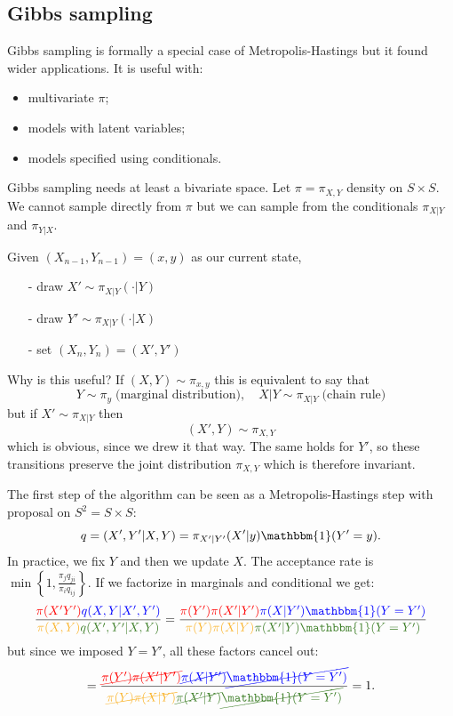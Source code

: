 \documentclass{article}
\begin{document}
\subsection{Gibbs sampling}
Gibbs sampling is formally a special case of Metropolis-Hastings but it found wider applications. It is useful with:
\begin{itemize}
    \item multivariate $\pi$;
    \item models with latent variables;
    \item models specified using conditionals.
\end{itemize}
Gibbs sampling needs at least a bivariate space. Let $\pi=\pi_{X,Y}$ density on $S\times S$. We cannot sample directly from $\pi$ but we can sample from the conditionals $\pi_{X|Y}$ and $\pi_{Y|X}$.
\begin{algorithm}
    Given $(X_{n-1},Y_{n-1})=(x,y)$ as our current state,
    \begin{itemize}
        \item [-] draw $X'\sim\pi_{X|Y}(\cdot|Y)$ 
        \item [-] draw $Y'\sim\pi_{X|Y}(\cdot|X)$
        \item [-] set $(X_n,Y_n)=(X',Y')$
    \end{itemize}
\end{algorithm}
Why is this useful? If $(X,Y)\sim\pi_{x,y}$ this is equivalent to say that
\[
Y\sim \pi_y \;\text{(marginal distribution)},\quad X|Y\sim\pi_{X|Y}\;\text{(chain rule)}
\]
but if $X'\sim \pi_{X|Y}$ then 
\[
(X',Y)\sim\pi_{X,Y}
\]
which is obvious, since we drew it that way. The same holds for $Y'$, so these transitions preserve the joint distribution $\pi_{X,Y}$ which is therefore invariant.
\begin{proof2}
 The first step of the algorithm can be seen as a Metropolis-Hastings step with proposal on $S^2=S\times S$:
        \[
        q=(X',Y'|X,Y)=\pi_{X'|Y'}(X'|y)\mathbbm{1}(Y'=y).
        \]
        In practice, we fix $Y$ and then we update $X$. The acceptance rate is $\min\left\{1,\frac{\pi_jq_{ji}}{\pi_iq_{ij}}\right\}$. If we factorize in marginals and conditional we get:
        \[
        \frac{\textcolor{red}{\pi(X'Y')}\textcolor{blue}{q(X,Y|X',Y')}}{\textcolor{Dandelion}{\pi(X,Y)}\textcolor{OliveGreen}{q(X',Y'|X,Y)}}=\frac{\textcolor{red}{\pi(Y')\pi(X'|Y')}\textcolor{blue}{\pi(X|Y')\mathbbm{1}(Y=Y')}}{\textcolor{Dandelion}{\pi(Y)\pi(X|Y)}\textcolor{OliveGreen}{\pi(X'|Y)\mathbbm{1}(Y=Y')}}
        \]
        but since we imposed $Y=Y'$, all these factors cancel out:\[
        =\frac{\textcolor{red}{\cancel{\pi(Y')\pi(X'|Y')}}\textcolor{blue}{\cancel{\pi(X|Y')}\cancel{\mathbbm{1}(Y=Y')}}}{\textcolor{Dandelion}{\cancel{\pi(Y)\pi(X|Y)}}\textcolor{OliveGreen}{\cancel{\pi(X'|Y)}\cancel{\mathbbm{1}(Y=Y')}}}=1.\]
\end{proof2}
\end{document}
